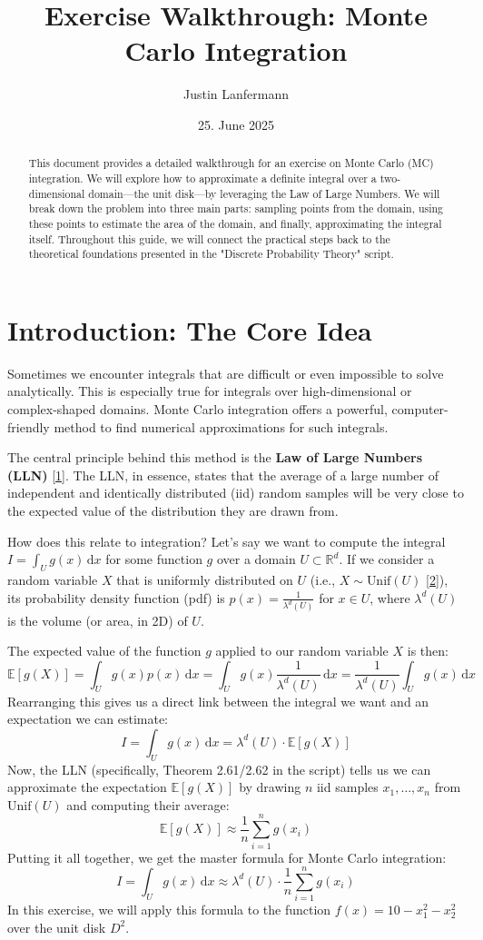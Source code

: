 \documentclass[11pt,a4paper]{article}
\title{Exercise Walkthrough: Monte Carlo Integration}
\author{Justin Lanfermann}
\date{25. June 2025}
\newcommand{\R}{\mathbb{R}}
\newcommand{\E}{\mathbb{E}}
\newcommand{\dd}{\,\mathrm{d}}
\begin{document}
\maketitle

\begin{abstract}
    This document provides a detailed walkthrough for an exercise on Monte Carlo (MC) integration. We will explore how to approximate a definite integral over a two-dimensional domain---the unit disk---by leveraging the Law of Large Numbers. We will break down the problem into three main parts: sampling points from the domain, using these points to estimate the area of the domain, and finally, approximating the integral itself. Throughout this guide, we will connect the practical steps back to the theoretical foundations presented in the "Discrete Probability Theory" script.
\end{abstract}

\section{Introduction: The Core Idea}

Sometimes we encounter integrals that are difficult or even impossible to solve analytically. This is especially true for integrals over high-dimensional or complex-shaped domains. Monte Carlo integration offers a powerful, computer-friendly method to find numerical approximations for such integrals.

The central principle behind this method is the \textbf{Law of Large Numbers (LLN)} \hyperlink{note1}{[1]}. The LLN, in essence, states that the average of a large number of independent and identically distributed (iid) random samples will be very close to the expected value of the distribution they are drawn from.

How does this relate to integration? Let's say we want to compute the integral $I = \int_U g(x) \dd x$ for some function $g$ over a domain $U \subset \R^d$.
If we consider a random variable $X$ that is uniformly distributed on $U$ (i.e., $X \sim \text{Unif}(U)$ \hyperlink{note2}{[2]}), its probability density function (pdf) is $p(x) = \frac{1}{\lambda^d(U)}$ for $x \in U$, where $\lambda^d(U)$ is the volume (or area, in 2D) of $U$.

The expected value of the function $g$ applied to our random variable $X$ is then:
\[
\E[g(X)] = \int_U g(x) p(x) \dd x = \int_U g(x) \frac{1}{\lambda^d(U)} \dd x = \frac{1}{\lambda^d(U)} \int_U g(x) \dd x
\]
Rearranging this gives us a direct link between the integral we want and an expectation we can estimate:
\[
I = \int_U g(x) \dd x = \lambda^d(U) \cdot \E[g(X)]
\]
Now, the LLN (specifically, Theorem 2.61/2.62 in the script) tells us we can approximate the expectation $\E[g(X)]$ by drawing $n$ iid samples $x_1, \dots, x_n$ from $\text{Unif}(U)$ and computing their average:
\[
\E[g(X)] \approx \frac{1}{n} \sum_{i=1}^n g(x_i)
\]
Putting it all together, we get the master formula for Monte Carlo integration:
\[
I = \int_U g(x) \dd x \approx \lambda^d(U) \cdot \frac{1}{n} \sum_{i=1}^n g(x_i)
\]
In this exercise, we will apply this formula to the function $f(x) = 10 - x_1^2 - x_2^2$ over the unit disk $D^2$.
\end{document}
